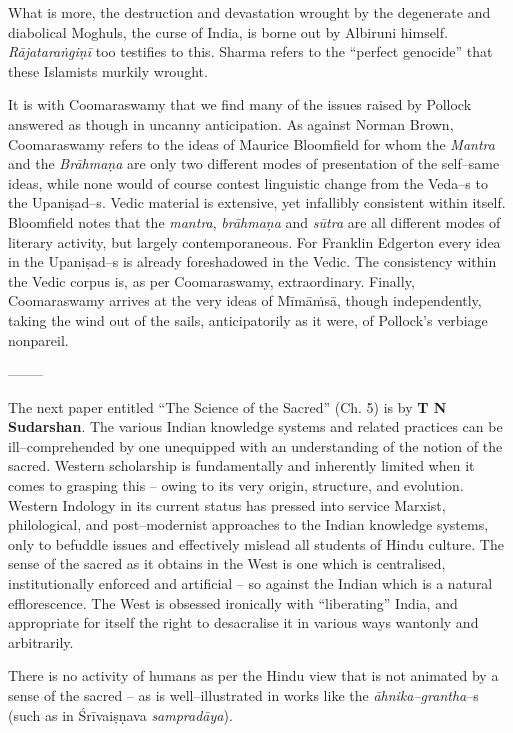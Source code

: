 What is more, the destruction and devastation wrought by the degenerate and diabolical Moghuls, the curse of India, is borne out by Albiruni himself. \textit{Rājataraṅgiṇī} too testifies to this. Sharma refers to the “perfect genocide” that these Islamists murkily wrought.

It is with Coomaraswamy that we find many of the issues raised by Pollock answered as though in uncanny anticipation. As against Norman Brown, Coomaraswamy refers to the ideas of Maurice Bloomfield for whom the \textit{Mantra} and the \textit{Brāhmaṇa} are only two different modes of presentation of the self–same ideas, while none would of course contest linguistic change from the Veda–s to the Upaniṣad–s. Vedic material is extensive, yet infallibly consistent within itself. Bloomfield notes that the \textit{mantra}, \textit{brāhmaṇa} and \textit{sūtra} are all different modes of literary activity, but largely contemporaneous. For Franklin Edgerton every idea in the Upaniṣad–s is already foreshadowed in the Vedic. The consistency within the Vedic corpus is, as per Coomaraswamy, extraordinary. Finally, Coomaraswamy arrives at the very ideas of Mīmāṁsā, though independently, taking the wind out of the sails, anticipatorily as it were, of Pollock's verbiage nonpareil. 

–––––

The next paper entitled “The Science of the Sacred” (Ch. 5) is by \textbf{T N Sudarshan}. The various Indian knowledge systems and related practices can be ill–comprehended by one unequipped with an understanding of the notion of the sacred. Western scholarship is fundamentally and inherently limited when it comes to grasping this – owing to its very origin, structure, and evolution. Western Indology in its current status has pressed into service Marxist, philological, and post–modernist approaches to the Indian knowledge systems, only to befuddle issues and effectively mislead all students of Hindu culture. The sense of the sacred as it obtains in the West is one which is centralised, institutionally enforced and artificial – so against the Indian which is a natural efflorescence. The West is obsessed ironically with “liberating” India, and appropriate for itself the right to desacralise it in various ways wantonly and arbitrarily.

There is no activity of humans as per the Hindu view that is not animated by a sense of the sacred – as is well–illustrated in works like the \textit{āhnika–grantha}–s (such as in Śrīvaiṣṇava \textit{sampradāya}).

